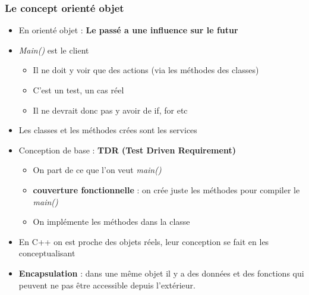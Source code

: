\documentclass[12pt,a4paper]{article}
\begin{document}
\subsubsection{Le concept orienté objet}
\begin{itemize}
\item En orienté objet : \textbf{Le passé a une influence sur le futur}
\item \textit{Main()} est le client
\begin{itemize}
\item Il ne doit y voir que des actions (via les méthodes des classes)
\item C'est un test, un cas réel
\item Il ne devrait donc pas y avoir de if, for etc
\end{itemize}
\item Les classes et les méthodes crées sont les services
\item Conception de base : \textbf{TDR (Test Driven Requirement)}
\begin{itemize}
\item On part de ce que l'on veut \textit{main()}
\item\textbf{couverture fonctionnelle} : on crée juste les méthodes pour compiler le \textit{main()}
\item On implémente les méthodes dans la classe
\end{itemize}
\item En C++ on est proche des objets réels, leur conception se fait en les conceptualisant
\item \textbf{Encapsulation} : dans une même objet il y a des données et des fonctions qui peuvent ne pas être accessible depuis l'extérieur.
\end{itemize}
\end{document}
